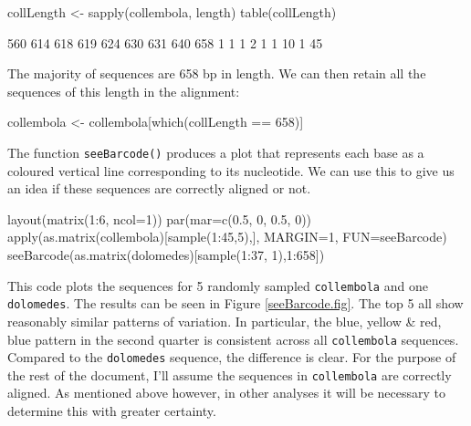 \documentclass{article}
\newcommand{\fun}[1]{\texttt{#1}}
\begin{document}
\begin{console}
collLength <- sapply(collembola, length)
table(collLength)
\end{console}

\begin{Routput}
 560 614 618 619 624 630 631 640 658 
  1   1   1   2   1   1  10   1  45
\end{Routput}

The majority of sequences are 658 bp in length. We can then retain all the sequences of this length in the alignment:

\begin{console}
collembola <- collembola[which(collLength == 658)]
\end{console}

The function \fun{seeBarcode()} produces a plot that represents each base as a coloured vertical line corresponding to its nucleotide. We can use this to give us an idea if these sequences are correctly aligned or not.

\begin{console}
layout(matrix(1:6, ncol=1))
par(mar=c(0.5, 0, 0.5, 0))
apply(as.matrix(collembola)[sample(1:45,5),], MARGIN=1, FUN=seeBarcode)
seeBarcode(as.matrix(dolomedes)[sample(1:37, 1),1:658])
\end{console}

This code plots the sequences for 5 randomly sampled \fun{collembola} and one \fun{dolomedes}. The results can be seen in Figure \ref{seeBarcode.fig}. The top 5 all show reasonably similar patterns of variation. In particular, the blue, yellow \& red, blue pattern in the second quarter is consistent across all \fun{collembola} sequences. Compared to the \fun{dolomedes} sequence, the difference is clear. For the purpose of the rest of the document, I'll assume the sequences in \fun{collembola} are correctly aligned. As mentioned above however, in other analyses it will be necessary to determine this with greater certainty.
\end{document}

